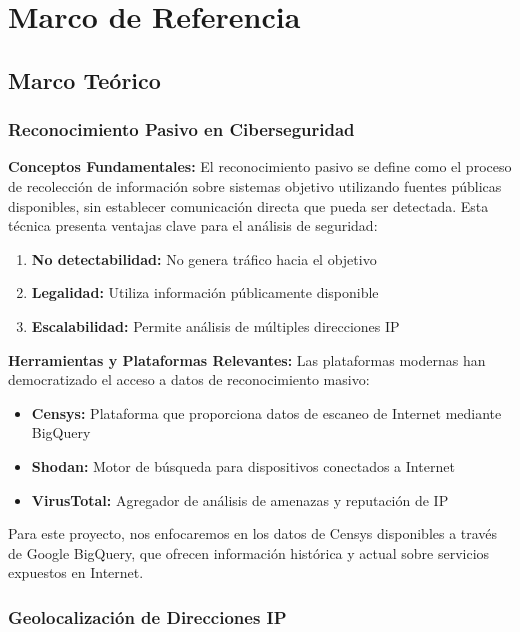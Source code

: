 \section{Marco de Referencia}

\subsection{Marco Teórico}

\subsubsection{Reconocimiento Pasivo en Ciberseguridad}

\textbf{Conceptos Fundamentales:}
El reconocimiento pasivo se define como el proceso de recolección de información sobre sistemas objetivo utilizando fuentes públicas disponibles, sin establecer comunicación directa que pueda ser detectada. Esta técnica presenta ventajas clave para el análisis de seguridad:

\begin{enumerate}
    \item \textbf{No detectabilidad:} No genera tráfico hacia el objetivo
    \item \textbf{Legalidad:} Utiliza información públicamente disponible
    \item \textbf{Escalabilidad:} Permite análisis de múltiples direcciones IP
\end{enumerate}

\textbf{Herramientas y Plataformas Relevantes:}
Las plataformas modernas han democratizado el acceso a datos de reconocimiento masivo:

\begin{itemize}
    \item \textbf{Censys:} Plataforma que proporciona datos de escaneo de Internet mediante BigQuery
    \item \textbf{Shodan:} Motor de búsqueda para dispositivos conectados a Internet
    \item \textbf{VirusTotal:} Agregador de análisis de amenazas y reputación de IP
\end{itemize}

Para este proyecto, nos enfocaremos en los datos de Censys disponibles a través de Google BigQuery, que ofrecen información histórica y actual sobre servicios expuestos en Internet.

\subsubsection{Geolocalización de Direcciones IP}

